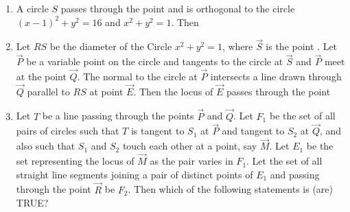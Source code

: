 \begin{enumerate}
\hfill{}
\begin{enumerate}
\end{enumerate}
\item A circle $S$ passes through the point  and is orthogonal to the circle $(x-1)^2+y^2=16$ and $x^2+y^2=1$. Then

\hfill {}
\begin{enumerate}
\end{enumerate}
\item Let $RS$ be the diameter of the Circle $x^{2} + y^{2} = 1$, where $\vec{S}$ is the point . Let $\vec{P}$ be a variable point  on the circle and tangents to the circle at $\vec{S}$ and $\vec{P}$ meet at the point $\vec{Q}$. The normal to the circle at $\vec{P}$ intersects a line drawn through $\vec{Q}$ parallel to $RS$ at point $\vec{E}$. Then the locus of $\vec{E}$ passes through the point

\hfill {}
\begin{enumerate}
\end{enumerate}
\item Let $T$ be a line passing through the points $\vec{P}$ and $\vec{Q}$. Let $F_1$ be the set of all pairs of circles  such that $T$ is tangent to $S_1$ at $\vec{P}$ and tangent to $S_2$ at $\vec{Q}$, and also such that $S_1$ and $S_2$ touch each other at a point, say $\vec{M}$. Let $E_1$ be the set representing the locus of $\vec{M}$ as the pair  varies in $F_1$. Let the set of all straight line segments joining a pair of distinct points of $E_1$ and passing through the point $\vec{R}$ be $F_2$. Then which of the following statements is (are) TRUE?


\end{enumerate}
